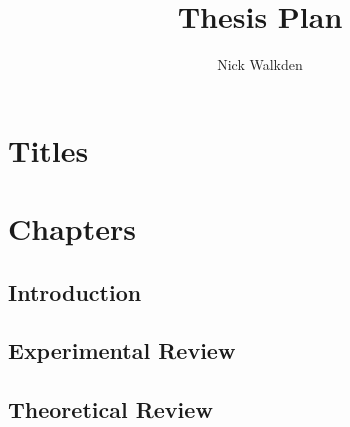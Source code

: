 \documentclass[11pt]{article}
\begin{document}
\title{Thesis Plan}
\author{Nick Walkden}
\date{}
\maketitle


\section{Titles}

\section{Chapters}

\subsection{Introduction}
\subsection{Experimental Review}
\subsection{Theoretical Review}
\newpage
\end{document}
